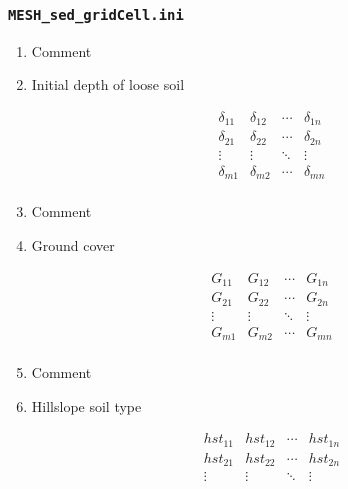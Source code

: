 \documentclass[12pt, letterpaper]{article}
\begin{document}
\subsubsection{\texttt{MESH\_sed\_gridCell.ini}}
{\tiny
\begin{enumerate}[label=Line \arabic*]\itemsep0em 
\item Comment
\item Initial depth of loose soil\\[-2.7em]
\begin{minipage}[t]{0.1\linewidth}
$$
\begin{matrix} 
\delta_{11} & \delta_{12} & \cdots & \delta_{1n} \\
\delta_{21} & \delta_{22} & \cdots & \delta_{2n} \\
\vdots & \vdots & \ddots & \vdots \\
\delta_{m1} & \delta_{m2} & \cdots & \delta_{mn} \\
\end{matrix}
$$
\end{minipage}
\item Comment
\item Ground cover\\[-2.7em]
\begin{minipage}[t]{0.1\linewidth}
\begin{flushright}
$$
\begin{matrix} 
G_{11} & G_{12} & \cdots & G_{1n} \\
G_{21} & G_{22} & \cdots & G_{2n} \\
\vdots & \vdots & \ddots & \vdots \\
G_{m1} & G_{m2} & \cdots & G_{mn}\\
\end{matrix}
$$
\end{flushright}
\end{minipage}
\item Comment
\item Hillslope soil type\\[-2.7em]
\begin{minipage}[t]{0.1\linewidth}
\begin{flushright}
$$
\begin{matrix} 
hst_{11} & hst_{12} & \cdots & hst_{1n} \\
hst_{21} & hst_{22} & \cdots & hst_{2n} \\
\vdots & \vdots & \ddots & \vdots \\

\end{matrix}$$
\end{flushright}
\end{minipage}
\end{enumerate}}
\end{document}
